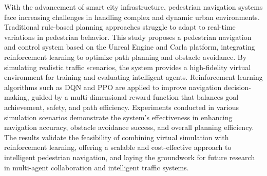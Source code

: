\begin{abstracten}

With the advancement of smart city infrastructure, pedestrian navigation systems face increasing challenges in handling complex and dynamic urban environments. Traditional rule-based planning approaches struggle to adapt to real-time variations in pedestrian behavior. This study proposes a pedestrian navigation and control system based on the Unreal Engine and Carla platform, integrating reinforcement learning to optimize path planning and obstacle avoidance. By simulating realistic traffic scenarios, the system provides a high-fidelity virtual environment for training and evaluating intelligent agents. Reinforcement learning algorithms such as DQN and PPO are applied to improve navigation decision-making, guided by a multi-dimensional reward function that balances goal achievement, safety, and path efficiency. Experiments conducted in various simulation scenarios demonstrate the system's effectiveness in enhancing navigation accuracy, obstacle avoidance success, and overall planning efficiency. The results validate the feasibility of combining virtual simulation with reinforcement learning, offering a scalable and cost-effective approach to intelligent pedestrian navigation, and laying the groundwork for future research in multi-agent collaboration and intelligent traffic systems.

\end{abstracten}
